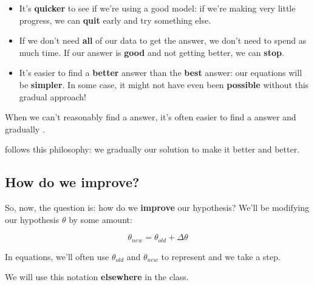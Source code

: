         \begin{itemize}
            \item It's \textbf{quicker} to see if we're using a good model: if we're making very little progress, we can \textbf{quit} early and try something else.
            
            \item If we don't need \textbf{all} of our data to get the answer, we don't need to spend as much time. If our answer is \textbf{good} and not getting better, we can \textbf{stop}.
            
            \item It's easier to find a \textbf{better} answer than the \textbf{best} answer: our equations will be \textbf{simpler}. In some case, it might not have even been \textbf{possible} without this gradual approach!
            \\
        \end{itemize}
        
        \begin{concept}
            When we can't reasonably find a  answer, it's often easier to find a  answer and gradually .
            
             follows this philosophy: we gradually  our solution to make it better and better.
        \end{concept}
        
        
        
    \subsection{How do we improve?}
    
        So, now, the question is: how do we \textbf{improve} our hypothesis? We'll be modifying our hypothesis $\theta$ by some amount:
        
        \begin{equation}
            \theta_{new} = \theta_{old} + \Delta \theta
        \end{equation}
        
        \begin{notation}
            In equations, we'll often use $\theta_{old}$ and $\theta_{new}$ to represent  and  we take a step.
            
            We will use this notation \textbf{elsewhere} in the class.
        \end{notation}
        
